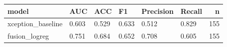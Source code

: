 \begin{tabular}{llllllr}
\toprule
model & AUC & ACC & F1 & Precision & Recall & n \\
\midrule
xception\_baseline & 0.603 & 0.529 & 0.633 & 0.512 & 0.829 & 155 \\
fusion\_logreg & 0.751 & 0.684 & 0.652 & 0.708 & 0.605 & 155 \\
\bottomrule
\end{tabular}
